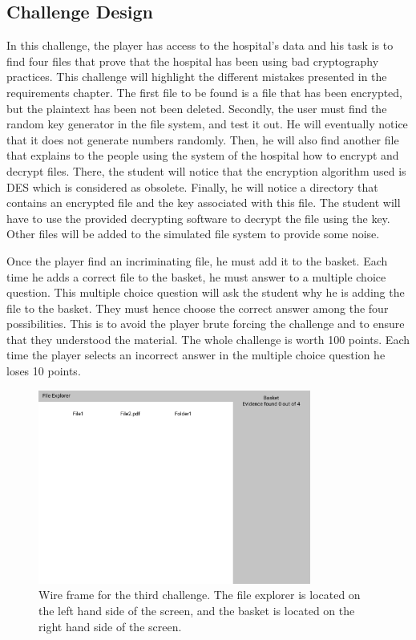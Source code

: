 \documentclass{l4proj}
\begin{document}
\subsection{Challenge Design}

In this challenge, the player has access to the hospital's data 
and his task is to find four files that prove that the hospital has been using bad cryptography practices.
This challenge will highlight the different mistakes presented in the requirements chapter.
The first file to be found is a file that has been encrypted, but the plaintext has been not been deleted.
Secondly, the user must find the random key generator in the file system, and test it out. 
He will eventually notice that it does not generate numbers randomly.
Then, he will also find another file that explains to the people using the system of the hospital
how to encrypt and decrypt files. There, the student will notice that the encryption algorithm used is 
DES which is considered as obsolete. 
Finally, he will notice a directory that contains an encrypted file and the key associated with this file.
The student will have to use the provided decrypting software to decrypt the file using the key.
Other files will be added to the simulated file system to provide some noise.

Once the player find an incriminating file, he must add it to the basket. 
Each time he adds a correct file to the basket, he must answer to a multiple choice question.
This multiple choice question will ask the student why he is adding the file to the basket.
They must hence choose the correct answer among the four possibilities. 
This is to avoid the player brute forcing the challenge and to ensure that they understood the material.
The whole challenge is worth 100 points. Each time the player selects an incorrect answer in the multiple
choice question he loses 10 points.

\begin{figure}[]
    \centering
    \includegraphics[width=0.8\textwidth]{images/WireframeChallenge3.png}
    \caption{Wire frame for the third challenge. 
    The file explorer is located on the left hand side of the screen, 
    and the basket is located on the right hand side of the screen.}
    \label{fig:Challenge3}
\end{figure}
\end{document}
